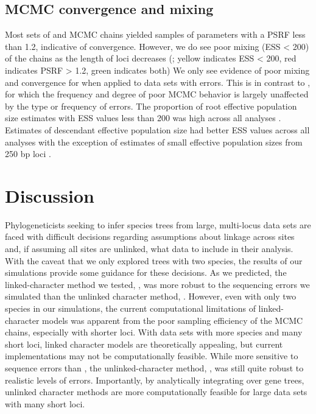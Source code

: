\subsection{MCMC convergence and mixing}
Most sets of \beast and \ecoevolity MCMC chains yielded samples of parameters with
a PSRF less than 1.2, indicative of convergence.
However, we do see poor mixing (ESS < 200) of the \beast chains as the length
of loci decreases (\mainfigs;
yellow indicates ESS < 200, red indicates PSRF > 1.2, green indicates both)
We only see evidence of poor mixing and convergence for \ecoevolity when
applied to data sets with errors.
This is in contrast to \beast, for which the frequency and degree of poor MCMC
behavior is largely unaffected by the type or frequency of errors.
The proportion of \beast root effective population size estimates with ESS 
values less than 200 was high across all analyses \rootfigsp.
Estimates of descendant effective population size had better ESS values across all 
analyses with the exception of estimates of small effective population sizes from 
250 bp loci \thetafigsp.


\section{Discussion}

Phylogeneticists seeking to infer species trees from large, multi-locus data
sets are faced with difficult decisions regarding assumptions about linkage
across sites and, if assuming all sites are unlinked, what data to include in
their analysis.
With the caveat that we only explored trees with two species,
the results of our simulations provide some guidance for these decisions. 
As we predicted, the linked-character method we tested, \beast, was more robust
to the sequencing errors we simulated than the unlinked character method,
\ecoevolity.
However, even with only two species in our simulations, the current
computational limitations of linked-character models was apparent from the poor
sampling efficiency of the MCMC chains, especially with shorter loci.
With data sets with more species and many short loci, linked character
models are theoretically appealing, but current implementations
may not be computationally feasible.
While more sensitive to sequence errors than \beast, the unlinked-character
method, \ecoevolity, was still quite robust to realistic levels of errors.
Importantly, by analytically integrating over gene trees, unlinked character
methods are more computationally feasible for large data sets with many
short loci.

